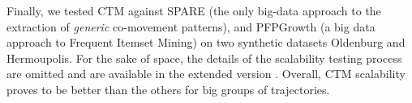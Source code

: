 \documentclass[
]{ceurart}
\renewcommand{\sf}[1]{\textsf{\textup{#1}}}
\newcommand{\mf}[1]{#1}
\begin{document}

Finally, we tested CTM against SPARE \citep{DBLP:journals/pvldb/FanZWT16} (the only big-data approach to the extraction of \textit{generic} co-movement patterns), and PFPGrowth \citep{DBLP:conf/recsys/LiWZZC08} (a big data approach to Frequent Itemset Mining) on two synthetic datasets \sf{Oldenburg} and \sf{Hermoupolis}.
For the sake of space, the details of the scalability testing process are omitted and are available in the extended version \cite{DBLP:journals/eswa/FranciaGG24}.
Overall, CTM scalability proves to be better than the others for big groups of trajectories.
\end{document}
